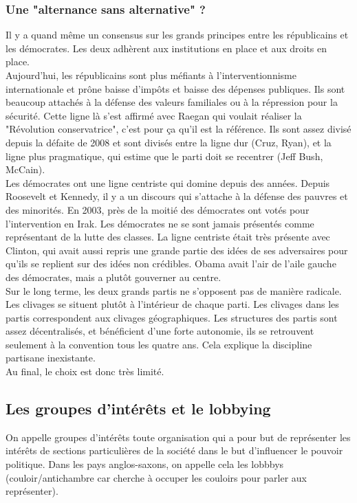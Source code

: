 \documentclass[10pt, a4paper, openany]{book}
\begin{document}
\subsubsection{Une "alternance sans alternative" ?}

Il y a quand même un consensus sur les grands principes entre les républicains et les démocrates. Les deux adhèrent aux institutions en place et aux droits en place. \\
Aujourd'hui, les républicains sont plus méfiants à l'interventionnisme internationale et prône baisse d'impôts et baisse des dépenses publiques. Ils sont beaucoup attachés à la défense des valeurs familiales ou à la répression pour la sécurité. Cette ligne là s'est affirmé avec Raegan qui voulait réaliser la "Révolution conservatrice", c'est pour ça qu'il est la référence. Ils sont assez divisé depuis la défaite de 2008 et sont divisés entre la ligne dur (Cruz, Ryan), et la ligne plus pragmatique, qui estime que le parti doit se recentrer (Jeff Bush, McCain). \\
Les démocrates ont une ligne centriste qui domine depuis des années. Depuis Roosevelt et Kennedy, il y a un discours qui s'attache à la défense des pauvres et des minorités. En 2003, près de la moitié des démocrates ont votés pour l'intervention en Irak. Les démocrates ne se sont jamais présentés comme représentant de la lutte des classes. La ligne centriste était très présente avec Clinton, qui avait aussi repris une grande partie des idées de ses adversaires pour qu'ils se replient sur des idées non crédibles. Obama avait l'air de l'aile gauche des démocrates, mais a plutôt gouverner au centre. \\
Sur le long terme, les deux grands partis ne s'opposent pas de manière radicale. Les clivages se situent plutôt à l'intérieur de chaque parti. Les clivages dans les partis correspondent aux clivages géographiques. Les structures des partis sont assez décentralisés, et bénéficient d'une forte autonomie, ils se retrouvent seulement à la convention tous les quatre ans. Cela explique la discipline partisane inexistante. \\
Au final, le choix est donc très limité. 


\subsection{Les groupes d'intérêts et le lobbying}

On appelle groupes d'intérêts toute organisation qui a pour but de représenter les intérêts de sections particulières de la société dans le but d'influencer le pouvoir politique. Dans les pays anglos-saxons, on appelle cela les lobbbys (couloir/antichambre car cherche à occuper les couloirs pour parler aux représenter). 
\end{document}

